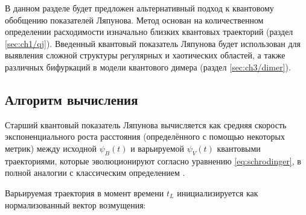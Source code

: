 В данном разделе будет предложен альтернативный подход к квантовому обобщению показателей Ляпунова.
Метод основан на количественном определении расходимости изначально близких квантовых траекторий (раздел \cref{sec:ch1/qj}).
Введенный квантовый показатель Ляпунова будет использован для выявления сложной структуры регулярных и хаотических областей, а также различных бифуркаций в модели квантового димера (раздел \cref{sec:ch3/dimer}).

\subsection{Алгоритм вычисления}\label{subsec:ch3/le/alg}

Старший квантовый показатель Ляпунова вычисляется как средняя скорость экспоненциального роста расстояния (определённого с помощью некоторых метрик) между исходной $\psi_B(t)$ и варьируемой $\psi_V(t)$ квантовыми траекториями, которые эволюционируют согласно уравнению \cref{eq:schrodinger}, в полной аналогии с классическим определением \cite{Benettin1976}.

Варьируемая траектория в момент времени $t_L$ инициализируется как нормализованный вектор возмущения:

